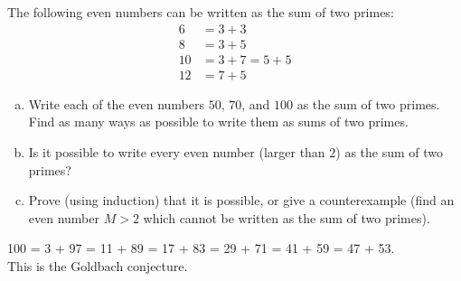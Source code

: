 \documentclass[11pt]{exam}
\begin{document}
\begin{questions}
\begin{enumerate}[a.)]
\end{enumerate}
%
%
%
% 
%
%


\question 
The following even numbers can be written as the sum of two primes:
\begin{align*}
6 &= 3 + 3 \\
8 &= 3 + 5 \\
10 &= 3 + 7 = 5 + 5 \\
12 &= 7 + 5
\end{align*}

\begin{enumerate}[a.]
\item Write each of the even numbers $50$, $70$, and $100$ as the sum of two primes. Find as many ways as possible to write them as sums of two primes.

\item Is it possible to write every even number (larger than $2$) as the sum of two primes? 
\item Prove (using induction) that it is possible, or give a counterexample (find an even number $M>2$ which cannot be written as the sum of two primes).
\end{enumerate}

\begin{solution}
100 = 3 + 97 = 11 + 89 = 17 + 83 = 29 + 71 = 41 + 59 = 47 + 53.\\
This is the Goldbach conjecture.
\end{solution}


\end{questions}
\end{document}
